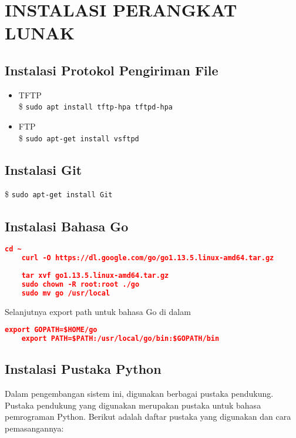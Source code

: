 \chapter{INSTALASI PERANGKAT LUNAK}

\section*{Instalasi Protokol Pengiriman File}
	
	\begin{itemize}
	\item TFTP \\
		\$ \texttt{sudo apt install tftp-hpa tftpd-hpa}
	\item FTP \\
		\$ \texttt{sudo apt-get install vsftpd}
	\end{itemize}
 
\section*{Instalasi Git}
	\$ \texttt{sudo apt-get install Git}
\label{installGit}
\section*{Instalasi Bahasa Go}
	\begin{lstlisting}[frame=single,tabsize=2,breaklines,caption={Instalasi Bahasa Go},label=InstalasiGo, captionpos=b, language=json,numbers=none]
	cd ~
	curl -O https://dl.google.com/go/go1.13.5.linux-amd64.tar.gz
	
	tar xvf go1.13.5.linux-amd64.tar.gz
	sudo chown -R root:root ./go
	sudo mv go /usr/local
	\end{lstlisting}
	Selanjutnya export path untuk bahasa Go di dalam 
	\begin{lstlisting}[frame=single,tabsize=2,breaklines,caption={Pengaturan Path},label=nonrootuser, captionpos=b, language=json,numbers=none]
	export GOPATH=$HOME/go
	export PATH=$PATH:/usr/local/go/bin:$GOPATH/bin
	\end{lstlisting}
	
\section*{Instalasi Pustaka Python} \label{install:pythonlibrary}
	Dalam pengembangan sistem ini, digunakan berbagai pustaka pendukung. Pustaka pendukung yang digunakan merupakan pustaka untuk bahasa pemrograman Python. Berikut adalah daftar pustaka yang digunakan dan cara pemasangannya:
	
